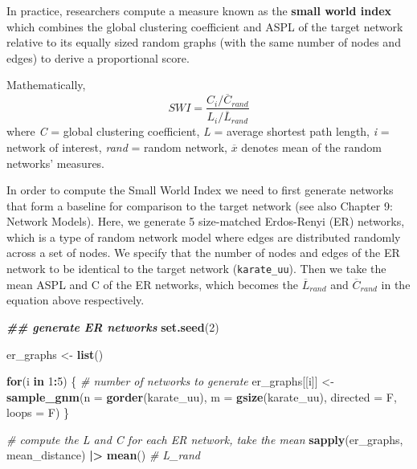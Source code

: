 \documentclass[
]{book}
\newenvironment{Shaded}{\begin{snugshade}}{\end{snugshade}}
\newcommand{\AttributeTok}[1]{\textcolor[rgb]{0.13,0.29,0.53}{#1}}
\newcommand{\CommentTok}[1]{\textcolor[rgb]{0.56,0.35,0.01}{\textit{#1}}}
\newcommand{\ControlFlowTok}[1]{\textcolor[rgb]{0.13,0.29,0.53}{\textbf{#1}}}
\newcommand{\DecValTok}[1]{\textcolor[rgb]{0.00,0.00,0.81}{#1}}
\newcommand{\DocumentationTok}[1]{\textcolor[rgb]{0.56,0.35,0.01}{\textbf{\textit{#1}}}}
\newcommand{\FunctionTok}[1]{\textcolor[rgb]{0.13,0.29,0.53}{\textbf{#1}}}
\newcommand{\NormalTok}[1]{#1}
\newcommand{\OtherTok}[1]{\textcolor[rgb]{0.56,0.35,0.01}{#1}}
\newcommand{\SpecialCharTok}[1]{\textcolor[rgb]{0.81,0.36,0.00}{\textbf{#1}}}
\begin{document}
In practice, researchers compute a measure known as the \textbf{small world index} which combines the global clustering coefficient and ASPL of the target network relative to its equally sized random graphs (with the same number of nodes and edges) to derive a proportional score.

Mathematically,
\[SWI = \frac{C_i / \overline C_{rand}}{L_i / \overline L_{rand}}\]
where \emph{C} = global clustering coefficient, \emph{L} = average shortest path length, \emph{i} = network of interest, \emph{rand} = random network, \(\overline x\) denotes mean of the random networks' measures.

In order to compute the Small World Index we need to first generate networks that form a baseline for comparison to the target network (see also Chapter 9: Network Models). Here, we generate 5 size-matched Erdos-Renyi (ER) networks, which is a type of random network model where edges are distributed randomly across a set of nodes. We specify that the number of nodes and edges of the ER network to be identical to the target network (\texttt{karate\_uu}). Then we take the mean ASPL and C of the ER networks, which becomes the \(\overline L_{rand}\) and \(\overline C_{rand}\) in the equation above respectively.

\begin{Shaded}
\begin{Highlighting}[]
\DocumentationTok{\#\# generate ER networks }
\FunctionTok{set.seed}\NormalTok{(}\DecValTok{2}\NormalTok{)}

\NormalTok{er\_graphs }\OtherTok{\textless{}{-}} \FunctionTok{list}\NormalTok{()}

\ControlFlowTok{for}\NormalTok{(i }\ControlFlowTok{in} \DecValTok{1}\SpecialCharTok{:}\DecValTok{5}\NormalTok{) \{ }\CommentTok{\# number of networks to generate}
\NormalTok{  er\_graphs[[i]] }\OtherTok{\textless{}{-}} \FunctionTok{sample\_gnm}\NormalTok{(}\AttributeTok{n =} \FunctionTok{gorder}\NormalTok{(karate\_uu), }\AttributeTok{m =} \FunctionTok{gsize}\NormalTok{(karate\_uu), }\AttributeTok{directed =}\NormalTok{ F, }\AttributeTok{loops =}\NormalTok{ F)}
\NormalTok{\}}

\CommentTok{\# compute the L and C for each ER network, take the mean }
\FunctionTok{sapply}\NormalTok{(er\_graphs, mean\_distance) }\SpecialCharTok{|\textgreater{}} \FunctionTok{mean}\NormalTok{() }\CommentTok{\# L\_rand}
\end{Highlighting}
\end{Shaded}
\end{document}
